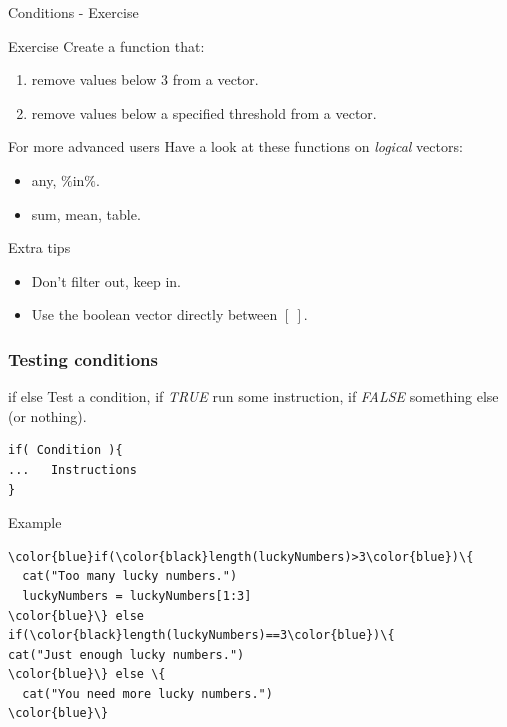 \documentclass[10pt]{beamer}
\newenvironment{xframe}[2][]
  {\begin{frame}[fragile,environment=xframe,#1]
  \frametitle{#2}}
  {\end{frame}}
\begin{document}
\begin{frame}{Conditions - Exercise}
  \begin{block}{Exercise}
  Create a function that: 
  \begin{enumerate}
  \item remove values below $3$ from a {\sf vector}.
  \item  remove values below a specified threshold from a {\sf vector}.
  \end{enumerate}
  \end{block}

  \bigskip

  \begin{block}{For more advanced users}
    Have a look at these functions on {\it logical} vectors:
    \begin{itemize}
    \item {\sf any}, $\%$in$\%$.
    \item  {\sf sum},  {\sf mean},  {\sf table}.
    \end{itemize}
  \end{block}

  \bigskip

  \begin{block}{Extra tips}
    \begin{itemize}
    \item Don't filter out, keep in.
    \item Use the boolean vector directly between $[~]$.
    \end{itemize}
  \end{block}
\end{frame}



\begin{xframe}{Testing conditions}
  \begin{block}{{\sf if else}}
    Test a condition, if {\it TRUE} run some instruction, if {\it FALSE} something else (or nothing).
\begin{verbatim}
if( Condition ){
...   Instructions
} 
\end{verbatim}  
  \end{block}
  \begin{exampleblock}{Example}
\begin{Verbatim}[commandchars=\\\{\}]
\color{blue}if(\color{black}length(luckyNumbers)>3\color{blue})\{
  cat("Too many lucky numbers.")
  luckyNumbers = luckyNumbers[1:3]
\color{blue}\} else if(\color{black}length(luckyNumbers)==3\color{blue})\{
cat("Just enough lucky numbers.")
\color{blue}\} else \{
  cat("You need more lucky numbers.")
\color{blue}\}
\end{Verbatim}  
  \end{exampleblock}
\end{xframe}
\end{document}
